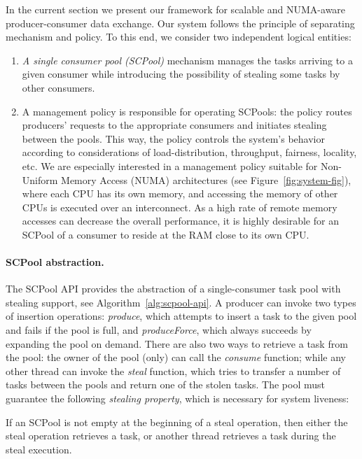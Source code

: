 In the current section we present our framework for scalable and NUMA-aware producer-consumer data exchange. 
Our system follows the principle of separating mechanism and policy.
To this end, we consider two independent logical entities: 
\begin{enumerate}
	\item \emph{A single consumer pool (SCPool)} mechanism manages the tasks arriving to a given consumer while introducing the possibility of stealing some tasks by other consumers.
	\item A management policy is responsible for operating SCPools: the policy routes producers' requests to the appropriate consumers and initiates stealing between the pools. This way, the policy controls the system's behavior according to considerations of load-distribution, throughput, fairness, locality, etc.
	We are especially interested in a management policy suitable for Non-Uniform Memory Access (NUMA) architectures (see Figure~\ref{fig:system-fig}), where each CPU has its own memory, and accessing the memory of other CPUs is executed over an interconnect. As a high rate of remote memory accesses can decrease the overall performance, it is highly desirable for an SCPool of a consumer to reside at the RAM close to its own CPU. 
\end{enumerate} 

\paragraph{SCPool abstraction.}

The SCPool API provides the abstraction of a single-consumer task pool with stealing support, see Algorithm~\ref{alg:scpool-api}.
A producer can invoke two types of insertion operations: \emph{produce}, which attempts to insert a task to the given pool and fails if the pool is full, and \emph{produceForce}, which always succeeds by expanding the pool on demand.
There are also two ways to retrieve a task from the pool: the owner of the pool (only) can call the \emph{consume} function; while any other thread can invoke the \emph{steal} function, which tries to transfer a number of tasks between the pools and return one of the stolen tasks. 
The pool must guarantee the following \emph{stealing property}, which is necessary for system liveness:
\begin{property}
\label{steal-progress-property}
If an SCPool is not empty at the beginning of a steal operation, then either the steal operation retrieves a task, or another thread retrieves a task during the steal execution.
\end{property}

